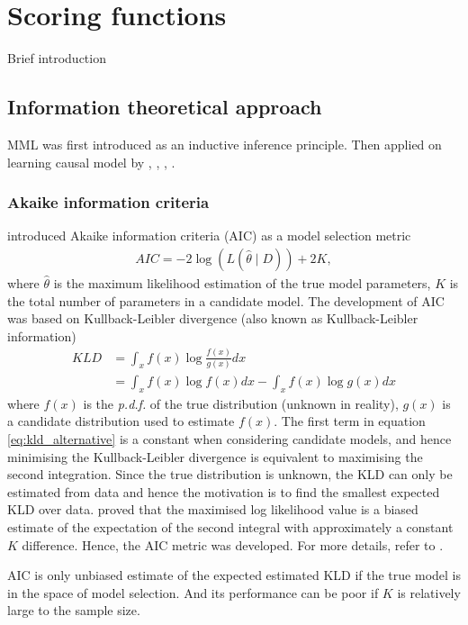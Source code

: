 \section{Scoring functions}
Brief introduction

\subsection{Information theoretical approach}
\cite{wallace1968} MML was first introduced as an inductive inference principle. Then applied on learning causal model by \cite{wallace1996causal}, \cite{neil1999learning}, \cite{li2004}, \cite{odonnell2010flexible}. 

\subsubsection{Akaike information criteria}
\cite{akaike1973information} introduced Akaike information criteria (AIC) as a model selection metric 
\begin{align}
\label{eq:aic}
AIC = -2 \log (L(\hat{\theta} \mid D)) + 2K,
\end{align}
where $\hat{\theta}$ is the maximum likelihood estimation of the true model parameters, $K$ is the total number of parameters in a candidate model. The development of AIC was based on Kullback-Leibler divergence (also known as Kullback-Leibler information)
\begin{align}
\label{eq:kld}
KLD &= \int_x f(x) \log \frac{f(x)}{g(x)}dx \\
\label{eq:kld_alternative}
&= \int_x f(x) \log f(x)dx - \int_x f(x)\log g(x)dx 
\end{align} 
where $f(x)$ is the \textit{p.d.f.} of the true distribution (unknown in reality), $g(x)$ is a candidate distribution used to estimate $f(x)$. The first term in equation \ref{eq:kld_alternative} is a constant when considering candidate models, and hence minimising the Kullback-Leibler divergence is equivalent to maximising the second integration. Since the true distribution is unknown, the KLD can only be estimated from data and hence the motivation is to find the smallest expected KLD over data. \citeauthor{akaike1973information} proved that the maximised log likelihood value is a biased estimate of the expectation of the second integral with approximately a constant $K$ difference. Hence, the AIC metric was developed. For more details, refer to \cite{burnham2004multimodel}. 

AIC is only unbiased estimate of the expected estimated KLD if the true model is in the space of model selection. And its performance can be poor if $K$ is relatively large to the sample size. 

